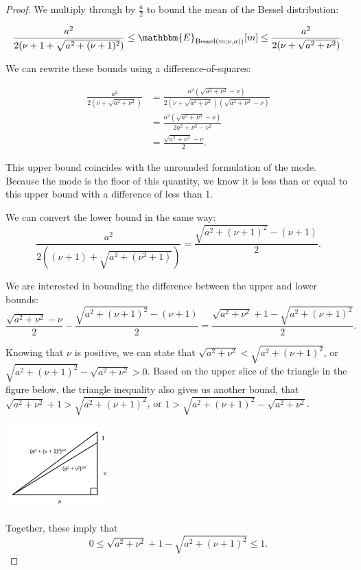 \documentclass[letterpaper]{article}
\newcommand{\Bess}[1]{\textup{Bessel}\left( #1 \right)}
\begin{document}
\begin{proof}
  We multiply through by $\frac{a}{2}$ to bound the mean of the Bessel
  distribution:
  
  \begin{equation}
      \frac{a^2}{2(\nu + 1 + \sqrt{a^2 + (\nu + 1)^2})} \leq \mathbbm{E}_{\Bess{m; \nu, a})}[m]
      \leq \frac{a^2}{2(\nu + \sqrt{a^2 + \nu^2})}.
  \end{equation}
  
  We can rewrite these bounds using a difference-of-squares:
  
  \begin{align*}
      \frac{a^2}{2(\nu + \sqrt{a^2 + \nu^2})} &= 
      \frac{a^2(\sqrt{a^2 + \nu^2} - \nu)}{2(\nu + \sqrt{a^2 + \nu^2})(\sqrt{a^2 + \nu^2} - \nu)} \\
      &= \frac{a^2(\sqrt{a^2 + \nu^2} - \nu)}{2a^2 + \nu^2 - \nu^2} \\
      &= \frac{\sqrt{a^2 + \nu^2} - \nu}{2}.
  \end{align*}
  
  This upper bound coincides with the unrounded formulation of the mode. Because
  the mode is the floor of this quantity, we know it is less than or equal to
  this upper bound with a difference of less than 1.
  
  We can convert the lower bound in the same way:
  \begin{equation*}
      \frac{a^2}{2((\nu + 1) + \sqrt{a^2 + (\nu^2 + 1)})} =  \frac{\sqrt{a^2 + (\nu + 1)^2} - (\nu + 1)}{2}.
  \end{equation*}
  
  We are interested in bounding the difference between the upper and lower
  bounds:
  \begin{equation}
      \frac{\sqrt{a^2 + \nu^2} - \nu}{2} - \frac{\sqrt{a^2 + (\nu + 1)^2} - (\nu + 1)}{2} = 
      \frac{\sqrt{a^2 + \nu^2} + 1 - \sqrt{a^2 + (\nu + 1)^2}}{2}.
  \end{equation}
  
  Knowing that $\nu$ is positive, we can state that $\sqrt{a^2 + \nu^2} <
  \sqrt{a^2 + (\nu + 1)^2}$, or $\sqrt{a^2 + (\nu + 1)^2} - \sqrt{a^2 + \nu^2} >
  0$. Based on the upper slice of the triangle in the figure below, the triangle
  inequality also gives us another bound, that $\sqrt{a^2 + \nu^2} + 1 >
  \sqrt{a^2 + (\nu + 1)^2}$, or $1 > \sqrt{a^2 + (\nu + 1)^2} - \sqrt{a^2 +
  \nu^2}$.
  
  \begin{center}
  \includegraphics[width=0.3\textwidth]{figures/triangle-bessel-model}
  \end{center}
  Together, these imply that 
  \[
      0 \leq \sqrt{a^2 + \nu^2} + 1 - \sqrt{a^2 + (\nu + 1)^2} \leq 1.
  \]
  

\end{proof}
\end{document}
